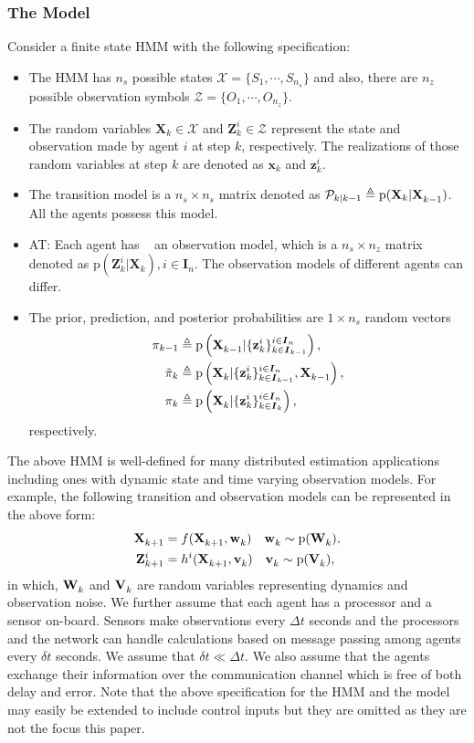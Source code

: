 \documentclass[conference]{IEEEtran}
\newcommand{\vect}[1]{{\mathbf{#1}}}
\theoremstyle{remark}
\newcommand{\axx}[1]{{\color{blue} AT: #1  \ }}  %
\newcommand{\XX}[3][2]{\mathbf{X}_{\tiny #2}^{\tiny #3}}
\newcommand{\pr}{\textrm{p}}
\newcommand{\bIn}{\boldsymbol{I}_{{n}}}
\newcommand{\bIk}{\boldsymbol{I}_{{k}}}
\newcommand{\bIkk}{\boldsymbol{I}_{{k-1}}}
\newcommand{\zz}[3][2]{\mathbf{z}_{ #2}^{ #3}}
\newcommand{\ZZ}[3][2]{\mathbf{Z}_{ #2}^{ #3}}
\begin{document}
\subsubsection*{The Model} Consider a finite state HMM with the following specification:
\begin{itemize}
	\item The HMM has $n_s$ possible states $\mathcal{X} = \{S_1,\cdots,S_{n_s}\} $ and also, there are $n_z$ possible observation symbols $\mathcal{Z} = \{O_1,\cdots,O_{n_z}\}$.
	\item The random variables $\vect{X}_k \in \mathcal{X} $ and $ \vect{Z}_k^i \in \mathcal{Z} $ represent the state and observation made by agent $i$ at step $ k $, respectively. The realizations of those random variables at step $k$ are denoted as $\vect{x}_k$ and $\vect{z}_k^i$.    
	\item The transition model is a $n_s\times n_s$ matrix denoted as $\mathcal{P}_{k \vert k-1}\triangleq \pr(\vect{X}_{k} | \XX[]{k-1}{})$. All the agents possess this model.
	\item \axx{Each agent has} an observation model, which is a $n_s\times n_z$ 
	matrix denoted as $\pr(\vect{Z}_{k}^{i} | \vect{X}_{k}), i\in\bIn$. The 
	observation models of different agents can differ.
	\item The prior, prediction, and posterior probabilities are $1\times n_s$ random vectors
	\begin{align}
		\pi_{k-1}&\triangleq \pr\left(\XX[]{k-1}{}|\{\zz{k}{i}\}^{i\in\bIn}_{k\in\bIkk}\right),\nonumber\\
		\tilde{\pi}_{k}&\triangleq \pr\left(\XX[]{k}{}|\{\zz{k}{i}\}^{i\in\bIn}_{k\in\bIkk},\XX[]{k-1}{}\right),\nonumber\\
		\pi_{k}&\triangleq \pr\left(\XX[]{k}{}|\{\zz{k}{i}\}^{i\in\bIn}_{k\in\bIk}\right),\nonumber
	\end{align}
	respectively.
\end{itemize}
The above HMM is well-defined for many distributed estimation applications including ones with dynamic state and time varying observation models. For example, the following transition and observation models can be represented in the above form:
\begin{align}
\XX[]{k+1}{} &= f(\XX[]{k+1}{},\ais{\vect{w}}{k}{})\quad \ais{\vect{w}}{k}{} \sim \pr(\ais{\vect{W}}{k}{}), \\
\ZZ{k+1}{i} &= h^i(\XX[]{k+1}{},\ais{\vect{v}}{k}{})\quad \ais{\vect{v}}{k}{} \sim \pr(\ais{\vect{V}}{k}{}), 
\end{align}
in which, $\ais{\vect{W}}{k}{}$ and $\ais{\vect{V}}{k}{}$ are random variables representing dynamics and observation noise. We further assume that each agent has a processor and a sensor on-board. Sensors make observations every $\Delta t$ seconds and the processors and the network can handle calculations based on message passing among agents every $\delta t$ seconds. We assume that $\delta t \ll \Delta t$. We also assume that the agents exchange their information over the communication channel which is free of both delay and error. Note that the above specification for the HMM and the model may easily be extended to include control inputs but they are omitted as they are not the focus this paper. 
\end{document}
